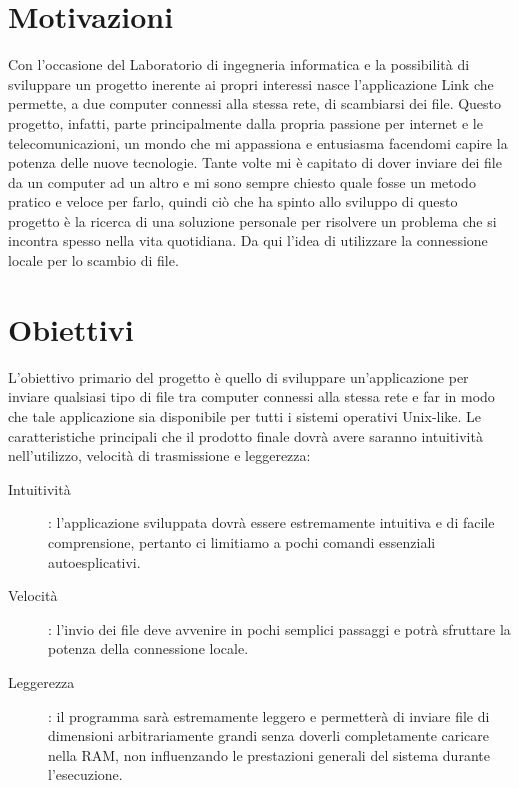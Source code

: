 \documentclass[11pt,fleqn]{book} %
\begin{document}
\section{Motivazioni}

Con l'occasione del Laboratorio di ingegneria informatica e la possibilità di sviluppare un progetto inerente ai propri interessi nasce l'applicazione Link che permette, a due computer connessi alla stessa rete, di scambiarsi dei file.
Questo progetto, infatti, parte principalmente dalla propria passione per internet e le telecomunicazioni, un mondo che mi appassiona e entusiasma facendomi capire la potenza delle nuove tecnologie.
Tante volte mi è capitato di dover inviare dei file da un computer ad un altro e mi sono sempre chiesto quale fosse un metodo pratico e veloce per farlo, quindi ciò che ha spinto allo sviluppo di questo progetto è la ricerca di una soluzione personale per risolvere un problema che si incontra spesso nella vita quotidiana.
Da qui l'idea di utilizzare la connessione locale per lo scambio di file.

\section{Obiettivi}


L'obiettivo primario del progetto è quello di sviluppare un'applicazione per inviare qualsiasi tipo di file tra computer connessi alla stessa rete e far in modo che tale applicazione sia disponibile per tutti i sistemi operativi Unix-like.
Le caratteristiche principali che il prodotto finale dovrà avere saranno intuitività nell'utilizzo, velocità di trasmissione e leggerezza:
\medskip
\begin{description}
\item[Intuitività]: l'applicazione sviluppata dovrà essere estremamente intuitiva e di facile comprensione, pertanto ci limitiamo a pochi comandi essenziali autoesplicativi.
\item [Velocità]: l'invio dei file deve avvenire in pochi semplici passaggi e potrà sfruttare la potenza della connessione locale.
\item [Leggerezza]: il programma sarà estremamente leggero e permetterà di inviare file di dimensioni arbitrariamente grandi senza doverli completamente caricare nella RAM, non influenzando le prestazioni generali del sistema durante l'esecuzione.
\end{description}
\end{document}
